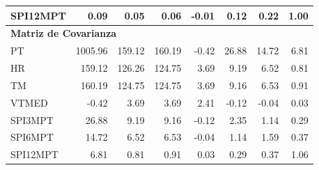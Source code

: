 \begin{table}[ht]
\begin{tabular}{lrrrrrrr}
SPI12MPT & 0.09 & 0.05 & 0.06 & -0.01 & 0.12 & 0.22 & 1.00 \\
\midrule
\multicolumn{8}{l}{\textbf{Matriz de Covarianza}} \\
\midrule
PT       & 1005.96 & 159.12 & 160.19 & -0.42 & 26.88 & 14.72 & 6.81 \\
HR       & 159.12 & 126.26 & 124.75 & 3.69 & 9.19 & 6.52 & 0.81 \\
TM       & 160.19 & 124.75 & 124.75 & 3.69 & 9.16 & 6.53 & 0.91 \\
VTMED    & -0.42 & 3.69 & 3.69 & 2.41 & -0.12 & -0.04 & 0.03 \\
SPI3MPT  & 26.88 & 9.19 & 9.16 & -0.12 & 2.35 & 1.14 & 0.29 \\
SPI6MPT  & 14.72 & 6.52 & 6.53 & -0.04 & 1.14 & 1.59 & 0.37 \\
SPI12MPT & 6.81 & 0.81 & 0.91 & 0.03 & 0.29 & 0.37 & 1.06 \\
\bottomrule
\end{tabular}
\end{table}





